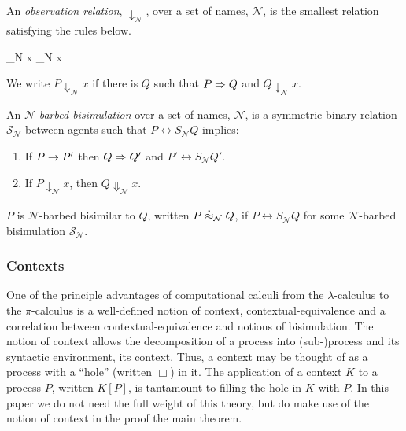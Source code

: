 \begin{definition}
An \emph{observation relation}, $\downarrow_{\mathcal N}$, over a set
of names, $\mathcal N$, is the smallest relation satisfying the rules
below.

		  { \downarrow_{\mathcal N} x}
		  { \downarrow_{\mathcal N} x}

We write $P \Downarrow_{\mathcal N} x$ if there is $Q$ such that 
$P \Rightarrow Q$ and $Q \downarrow_{\mathcal N} x$.
\end{definition}

\begin{definition}
An  ${\mathcal N}$-\emph{barbed bisimulation} over a set of names, ${\mathcal N}$, is a symmetric binary relation 
${\mathcal S}_{\mathcal N}$ between agents such that $P\rel{S}_{\mathcal N}Q$ implies:
\begin{enumerate}
\item If $P \rightarrow P'$ then $Q \Rightarrow Q'$ and $P'\rel{S}_{\mathcal N} Q'$.
\item If $P\downarrow_{\mathcal N} x$, then $Q\Downarrow_{\mathcal N} x$.
\end{enumerate}
$P$ is ${\mathcal N}$-barbed bisimilar to $Q$, written
$P \stackrel{\centerdot}{\approx}_{\mathcal N} Q$, if $P \rel{S}_{\mathcal N} Q$ for some ${\mathcal N}$-barbed bisimulation ${\mathcal S}_{\mathcal N}$.
\end{definition}

\subsubsection{Contexts}

One of the principle advantages of computational calculi from the
$\lambda$-calculus to the $\pi$-calculus is a well-defined notion of context,
contextual-equivalence and a correlation between
contextual-equivalence and notions of bisimulation. The notion of
context allows the decomposition of a process into (sub-)process and
its syntactic environment, its context. Thus, a context may be
thought of as a process with a ``hole'' (written $\Box$) in it. The
application of a context $K$ to a process $P$, written $K[P]$, is
tantamount to filling the hole in $K$ with $P$. In this paper we do
not need the full weight of this theory, but do make use of the notion
of context in the proof the main theorem. 

